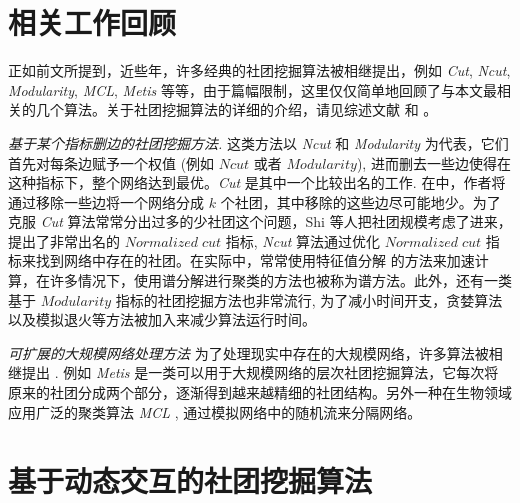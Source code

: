 \section{相关工作回顾}
\label{sec:relatedwork}
正如前文所提到，近些年，许多经典的社团挖掘算法被相继提出，例如 \emph{Cut}, \emph{Ncut}, \emph{Modularity}, \emph{MCL}, \emph{Metis} 等等，由于篇幅限制，这里仅仅简单地回顾了与本文最相关的几个算法。关于社团挖掘算法的详细的介绍，请见综述文献 和  。 \par
\vspace{1mm}
\emph{基于某个指标删边的社团挖掘方法.} 这类方法以 \emph{Ncut} 和 \emph{Modularity} 为代表，它们首先对每条边赋予一个权值 (例如 $Ncut$ 或者 $Modularity$), 进而删去一些边使得在这种指标下，整个网络达到最优。\emph{Cut} 是其中一个比较出名的工作. 在中，作者将通过移除一些边将一个网络分成 $k$ 个社团，其中移除的这些边尽可能地少。为了克服 \emph{Cut} 算法常常分出过多的少社团这个问题，Shi 等人把社团规模考虑了进来，提出了非常出名的 $Normalized \; cut$ 指标, \emph{Ncut} 算法通过优化 $Normalized \; cut$ 指标来找到网络中存在的社团。在实际中，常常使用特征值分解 的方法来加速计算，在许多情况下，使用谱分解进行聚类的方法也被称为谱方法。此外，还有一类基于 $Modularity$ 指标的社团挖掘方法也非常流行, 为了减小时间开支，贪婪算法以及模拟退火等方法被加入来减少算法运行时间。\par
\vspace{1mm}
\emph{可扩展的大规模网络处理方法} 为了处理现实中存在的大规模网络，许多算法被相继提出   . 例如 \emph{Metis} 是一类可以用于大规模网络的层次社团挖掘算法，它每次将原来的社团分成两个部分，逐渐得到越来越精细的社团结构。另外一种在生物领域应用广泛的聚类算法 \emph{MCL} , 通过模拟网络中的随机流来分隔网络。

\section{基于动态交互的社团挖掘算法}
\label{sec:algorithm}

